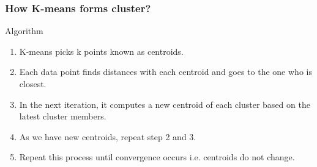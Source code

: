 \begin{frame}[fragile]\frametitle{How  K-means forms cluster?}
Algorithm
\begin{enumerate}
\item  K-means picks k points known as centroids.
\item  Each data point finds distances with each centroid and goes to the one who is closest.
\item In the next iteration, it computes a new centroid of each cluster based on the latest cluster members.
\item As we have new centroids, repeat step 2 and 3. 
\item Repeat this process until convergence occurs i.e. centroids do not change.
\end{enumerate}
\end{frame}

%
%
%
%



